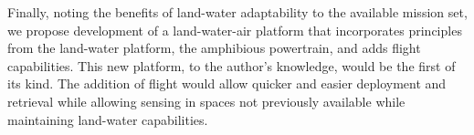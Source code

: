 \documentclass{article}
\begin{document}
\begin{singlespace}
Finally, noting the benefits of land-water adaptability to the available mission set, we propose development of a land-water-air platform that incorporates principles from the land-water platform, the amphibious powertrain, and adds flight capabilities. This new platform, to the author's knowledge, would be the first of its kind. The addition of flight would allow quicker and easier deployment and retrieval while allowing sensing in spaces not previously available while maintaining land-water capabilities.


\end{singlespace}
\end{document}
